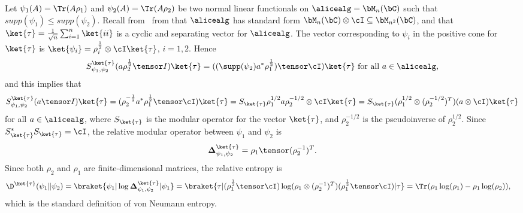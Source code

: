 \begin{example} \label{exam:relativeentropy}
	Let $ \psi_1 (A) = \Tr(A \rho_1) $ and $\psi_2(A) = \Tr(A \rho_2)$ be two normal linear functionals on $\alicealg = \bM_n (\bC)$ such that 
	$supp(\psi_1) \leq supp(\psi_2)$. Recall from~ from that $\alicealg$ has standard form $\bM_n (\bC) \otimes \cI \subseteq \bM_{n^2} (\bC)$, and that $\ket{\tau} =  \frac{1}{\sqrt{n}} \sum_{i=1}^n\ket{ii}$ is a cyclic and separating vector for $\alicealg$. The vector corresponding to $\psi_i$ in the positive cone for $\ket{\tau}$ is $\ket{\psi_i} = 
	\rho_i^{\frac{1}{2}} \otimes \cI \ket{\tau}$, $i=1,2$. Hence
	\begin{equation*}
		S^{\ket{\tau}}_{\psi_1, \psi_2} (a \rho_2^{\frac{1}{2}}\tensor I) \ket{\tau} = ((\supp(\psi_2) a^{*}\rho_1^{\frac{1}{2}})\tensor  \cI) \ket{\tau} \text{ for all } a \in \alicealg,
	\end{equation*}
	and this implies that 
	\begin{equation*}
		S^{\ket{\tau}}_{\psi_1, \psi_2} (a \tensor I)  \ket{\tau} = ( \rho_2^{-\frac{1}{2}} a^* \rho_1^{\frac{1}{2}}\tensor \cI)   \ket{\tau}
		= S_{\ket{\tau}} \rho_1^{1/2} a \rho_2^{-1/2} \otimes \cI \ket{\tau}
		= S_{\ket{\tau}} (\rho_1^{1/2} \otimes (\rho_2^{-1/2})^T) (a \otimes \cI) \ket{\tau}
	\end{equation*}
	for all $a \in \alicealg$, where $S_{\ket{\tau}}$ is the modular operator for the vector $\ket{\tau}$, and $\rho_2^{-1/2}$ is the pseudoinverse of $\rho_2^{1/2}$. Since $S_{\ket{\tau}}^* S_{\ket{\tau}} = \cI$, the relative modular operator between $\psi_1$ and $\psi_2$ is
	\begin{equation*}
		\mathbf{\Delta}^{\ket{\tau}}_{\psi_1, \psi_2} = \rho_1 \tensor (\rho_2^{-1})^{T}.
	\end{equation*}
	Since both $\rho_2$ and $\rho_1$ are finite-dimensional matrices, the relative entropy is 
	\begin{align*}
		\D^{\ket{\tau}}(\psi_1 \| \psi_2) &= \braket{\psi_1|\log \mathbf{\Delta}_{\psi_1,\psi_2}^{\ket{\tau}}|\psi_1} 
		= \braket{\tau| (\rho_1^{\frac{1}{2}} \tensor \cI) \log(\rho_1 \otimes (\rho_2^{-1})^T) (\rho_1^{\frac{1}{2}} \tensor \cI)|\tau}
		= \Tr( \rho_1  \log(\rho_1) - \rho_1 \log(\rho_2)),
	\end{align*}
	which is the standard definition of von Neumann entropy. 
\end{example}

